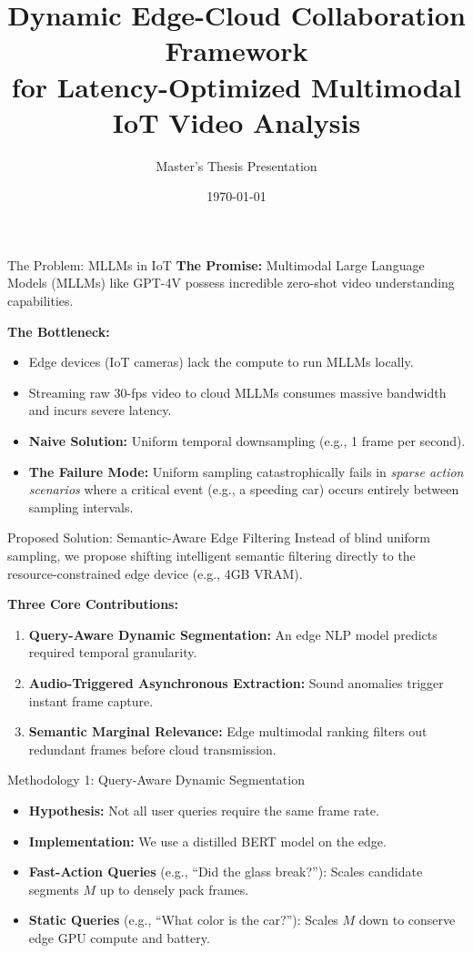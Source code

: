 \documentclass[aspectratio=169]{beamer}
\title[Dynamic Edge-Cloud MLLM IoT]{Dynamic Edge-Cloud Collaboration Framework\\for Latency-Optimized Multimodal IoT Video Analysis}
\author{Master's Thesis Presentation}
\institute{Department of Computer Science}
\date{\today}
\begin{document}
\begin{frame}
    \titlepage
\end{frame}

\begin{frame}{The Problem: MLLMs in IoT}
    \textbf{The Promise:} Multimodal Large Language Models (MLLMs) like GPT-4V possess incredible zero-shot video understanding capabilities.
    \vspace{0.5cm}
    
    \textbf{The Bottleneck:}
    \begin{itemize}
        \item Edge devices (IoT cameras) lack the compute to run MLLMs locally.
        \item Streaming raw 30-fps video to cloud MLLMs consumes massive bandwidth and incurs severe latency.
        \item \textbf{Naive Solution:} Uniform temporal downsampling (e.g., 1 frame per second).
        \item \textbf{The Failure Mode:} Uniform sampling catastrophically fails in \textit{sparse action scenarios} where a critical event (e.g., a speeding car) occurs entirely between sampling intervals.
    \end{itemize}
\end{frame}

\begin{frame}{Proposed Solution: Semantic-Aware Edge Filtering}
    Instead of blind uniform sampling, we propose shifting intelligent semantic filtering directly to the resource-constrained edge device (e.g., 4GB VRAM).
    \vspace{0.5cm}
    
    \textbf{Three Core Contributions:}
    \begin{enumerate}
        \item \textbf{Query-Aware Dynamic Segmentation:} An edge NLP model predicts required temporal granularity.
        \item \textbf{Audio-Triggered Asynchronous Extraction:} Sound anomalies trigger instant frame capture.
        \item \textbf{Semantic Marginal Relevance:} Edge multimodal ranking filters out redundant frames before cloud transmission.
    \end{enumerate}
\end{frame}

\begin{frame}{Methodology 1: Query-Aware Dynamic Segmentation}
    \begin{itemize}
        \item \textbf{Hypothesis:} Not all user queries require the same frame rate.
        \item \textbf{Implementation:} We use a distilled BERT model on the edge.
        \item \textbf{Fast-Action Queries} (e.g., ``Did the glass break?''): Scales candidate segments $M$ up to densely pack frames.
        \item \textbf{Static Queries} (e.g., ``What color is the car?''): Scales $M$ down to conserve edge GPU compute and battery.
    \end{itemize}
\end{frame}
\end{document}
